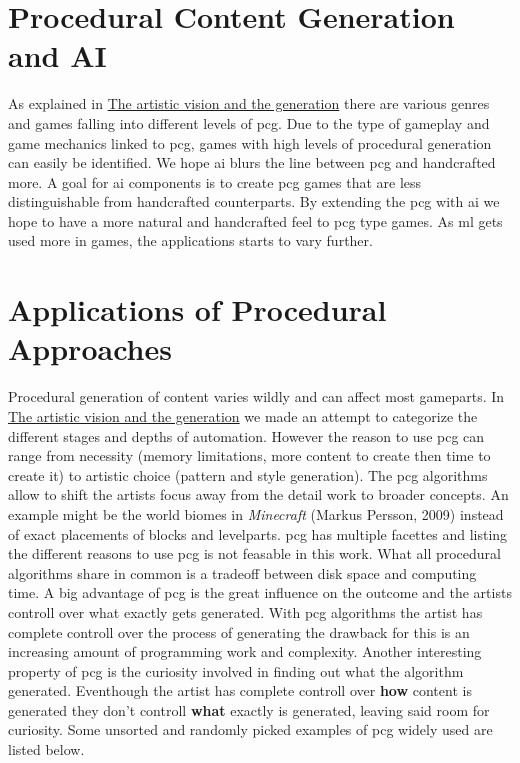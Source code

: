\documentclass[10pt,a4paper]{article}
\begin{document}
\section{Procedural Content Generation and AI}
As explained in \hyperref[sec:visionVSgeneration]{The artistic vision and the generation} there are various genres and games falling into different levels of \gls{pcg}. Due to the type of gameplay and game mechanics linked to \gls{pcg}, games with high levels of procedural generation can easily be identified. We hope \gls{ai} blurs the line between \gls{pcg} and handcrafted more. A goal for \gls{ai} components is to create \gls{pcg} games that are less distinguishable from handcrafted counterparts. By extending the \gls{pcg} with \gls{ai} we hope to have a more natural and handcrafted feel to \gls{pcg} type games. As \gls{ml} gets used more in games, the applications starts to vary further.

\section{Applications of Procedural Approaches}
Procedural generation of content varies wildly and can affect most gameparts. In \hyperref[sec:visionVSgeneration]{The artistic vision and the generation} we made an attempt to categorize the different stages and depths of automation. However the reason to use \gls{pcg} can range from necessity (memory limitations, more content to create then time to create it) to artistic choice (pattern and style generation). The \gls{pcg} algorithms allow to shift the artists focus away from the detail work to broader concepts. An example might be the world biomes in \textit{Minecraft} (Markus Persson, 2009) instead of exact placements of blocks and levelparts. \gls{pcg} has multiple facettes and listing the different reasons to use \gls{pcg} is not feasable in this work. What all procedural algorithms share in common is a tradeoff between disk space and computing time. A big advantage of \gls{pcg} is the great influence on the outcome and the artists controll over what exactly gets generated. With \gls{pcg} algorithms the artist has complete controll over the process of generating the drawback for this is an increasing amount of programming work and complexity. Another interesting property of \gls{pcg} is the curiosity involved in finding out what the algorithm generated. Eventhough the artist has complete controll over \textbf{how} content is generated they don't controll \textbf{what} exactly is generated, leaving said room for curiosity. Some unsorted and randomly picked examples of \gls{pcg} widely used are listed below.
\end{document}

